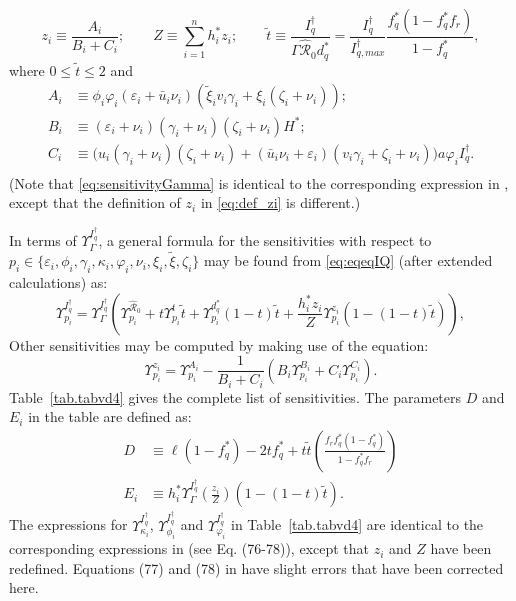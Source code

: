 \documentclass[a4paper]{article}
\newcommand{\fiVar }{\phi_{i} }
\newcommand{\kiVar }{\kappa_{i} }
\newcommand{\biVar }{h_{i} }
\newcommand{\IqstarmaxVar}{I_{q,max}^{\dagger}}
\newcommand{\hatmuVar}{d_q}
\newcommand{\miVar}{\varphi_i}
\newcommand{\starVar}{\dagger}
\begin{document}
\begin{equation}
z_i \equiv  \frac{A_i}{B_i + C_i};\label{eq:def_zi}\qquad 
 Z \equiv \sum_{i=1}^n \biVar ^*z_i ; \qquad 
\tilde{t} \equiv \frac{I_q^\starVar}{ \Gamma \widehat{\mathcal R}_0 \hatmuVar^*}=\frac{I_q^\starVar}{\IqstarmaxVar}\frac{f_q^*(1-f_q^* f_r)}{1-f_q^*},
\end{equation}
where $0 \leqslant \tilde{t} \leqslant 2$ and  
\begin{equation}
\begin{aligned}
A_i  &\equiv \phi_i\varphi_i (\varepsilon_i+\bar u_i\nu_i)\left(\widetilde\xi_iv_i\gamma_i+\xi_i(\zeta_i+\nu_i)\right);\\
B_i &\equiv   (\varepsilon_i+\nu_i)(\gamma_i+\nu_i)(\zeta_i+\nu_i)H^*;\\
C_i &\equiv  \Big(u_i(\gamma_i+\nu_i)(\zeta_i+\nu_i) + (\bar u_i\nu_i+\varepsilon_i)(v_i\gamma_i + \zeta_i+\nu_i) \Big)a\varphi_i I^\dagger_q.\label{eq:def_ABCi}\\ 
\end{aligned}
\end{equation}
(Note that \eqref{eq:sensitivityGamma} is identical to the corresponding expression in \cite{jck-19}, except  that the definition of $z_i$ in \eqref{eq:def_zi}  is different.)

In terms of  $ \varUpsilon_\Gamma^{I_q^\starVar}$, a general formula for the sensitivities with respect to $ p_i \in \{\varepsilon_i, \fiVar ,\gamma_i, \kiVar ,\miVar ,\nu_i,\xi_i,\widetilde\xi, \zeta_i\}$ may be found from \eqref{eq:eqeqIQ} (after extended calculations)  as:
\begin{equation}\label{eq:sensIq_wrt_pj}
\varUpsilon_{p_i}^{I_q^\starVar} =
\varUpsilon_{\Gamma}^{I_q^\starVar} \left(\varUpsilon_{p_i}^{\widehat{\mathcal R}_0}
+ t\varUpsilon_{p_i}^{t}\tilde{t}  + \varUpsilon_{p_i}^{\hatmuVar^*}(1-t)\tilde{t}   
+  \frac{\biVar ^*z_i}{Z} \varUpsilon_{p_i}^{z_i} 
\left(1 - (1-t)\tilde{t} \right)
\right),
\end{equation}
Other sensitivities may be computed by making use of the equation:
\begin{equation}
\varUpsilon_{p_i}^{z_i} = \varUpsilon_{p_i}^{A_i} - \frac{1}{B_i+C_i}\left(B_i\varUpsilon_{p_i}^{B_i} + C_i\varUpsilon_{p_i}^{C_i} \right).
\end{equation}
Table~\ref{tab.tabvd4} gives the complete list of sensitivities. The parameters $D$ and $E_i$ in the table are defined as:
\begin{equation}
\begin{aligned}
D &\equiv \ell (1-f_q^*) - 2tf_q^* + t\tilde{t}\left(\frac{f_rf_q^*(1-f_q^*)}{1-f_q^*f_r}\right)\\   
E_i &\equiv \biVar ^*\varUpsilon_{\Gamma}^{I_q^\starVar} \left(\frac{z_i}{Z}\right)(1 - (1-t)\tilde{t} ).
\end{aligned}
\end{equation}
The expressions for $\varUpsilon_{\kiVar }^{I_q^\starVar}$, $\varUpsilon_{\fiVar }^{I_q^\starVar}$ and $\varUpsilon_{\miVar }^{I_q^\starVar}$ in Table~\ref{tab.tabvd4} are identical to the corresponding expressions in \cite{jck-19} (see Eq.  (76-78)), except that $z_i$ and $Z$ have been redefined. Equations (77) and (78) in \cite{jck-19} have 
slight errors that have been corrected here.
\end{document}
